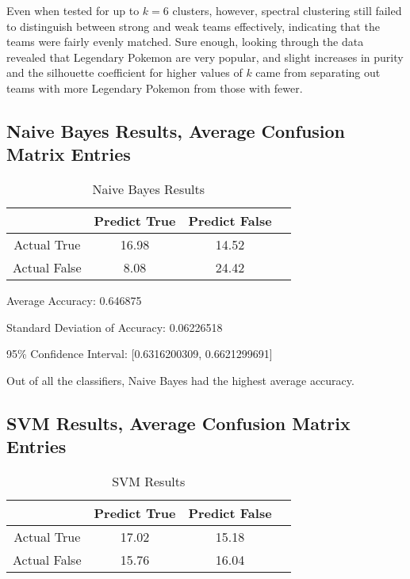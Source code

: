 \documentclass{acm_proc_article-sp}
\begin{document}
Even when tested for up to $k=6$ clusters, however, spectral clustering still failed to distinguish between strong and weak teams effectively, indicating that the teams were fairly evenly matched. Sure enough, looking through the data revealed that Legendary Pokemon are very popular, and slight increases in purity and the silhouette coefficient for higher values of $k$ came from separating out teams with more Legendary Pokemon from those with fewer.

\subsection{Naive Bayes Results, Average Confusion Matrix Entries}

\begin{table}

\centering

\caption{Naive Bayes Results}

\begin{tabular}{|c|c|c|l|} \hline

 & Predict True & Predict False \\ \hline
Actual True & 16.98 & 14.52 \\ \hline
Actual False & 8.08 & 24.42 \\ \hline

\end{tabular}

\end{table}

Average Accuracy: 0.646875

Standard Deviation of Accuracy: 0.06226518

95\% Confidence Interval: [0.6316200309, 0.6621299691]

Out of all the classifiers, Naive Bayes had the highest average accuracy. 

\subsection{SVM Results, Average Confusion Matrix Entries}

\begin{table}

\centering

\caption{SVM Results}

\begin{tabular}{|c|c|c|l|} \hline

 & Predict True & Predict False \\ \hline
Actual True & 17.02 & 15.18 \\ \hline
Actual False & 15.76 & 16.04 \\ \hline

\end{tabular}

\end{table}
\end{document}

